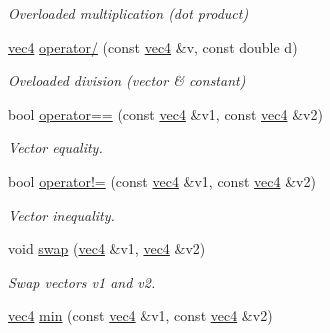\begin{DoxyCompactItemize}
\begin{DoxyCompactList}\small\item\em \-Overloaded multiplication (dot product) \end{DoxyCompactList}\item 
\hypertarget{classutil_1_1math_1_1vec4_a2b87dfafb4fb877b18db5a9f79dbe906}{\hyperlink{classutil_1_1math_1_1vec4}{vec4} \hyperlink{classutil_1_1math_1_1vec4_a2b87dfafb4fb877b18db5a9f79dbe906}{operator/} (const \hyperlink{classutil_1_1math_1_1vec4}{vec4} \&v, const double d)}\label{classutil_1_1math_1_1vec4_a2b87dfafb4fb877b18db5a9f79dbe906}

\begin{DoxyCompactList}\small\item\em \-Oveloaded division (vector \& constant) \end{DoxyCompactList}\item 
\hypertarget{classutil_1_1math_1_1vec4_adb09bd6661ff658c2575e34f5e92ed35}{bool \hyperlink{classutil_1_1math_1_1vec4_adb09bd6661ff658c2575e34f5e92ed35}{operator==} (const \hyperlink{classutil_1_1math_1_1vec4}{vec4} \&v1, const \hyperlink{classutil_1_1math_1_1vec4}{vec4} \&v2)}\label{classutil_1_1math_1_1vec4_adb09bd6661ff658c2575e34f5e92ed35}

\begin{DoxyCompactList}\small\item\em \-Vector equality. \end{DoxyCompactList}\item 
\hypertarget{classutil_1_1math_1_1vec4_a6a0e8f6719192b8a57231393cd0cab95}{bool \hyperlink{classutil_1_1math_1_1vec4_a6a0e8f6719192b8a57231393cd0cab95}{operator!=} (const \hyperlink{classutil_1_1math_1_1vec4}{vec4} \&v1, const \hyperlink{classutil_1_1math_1_1vec4}{vec4} \&v2)}\label{classutil_1_1math_1_1vec4_a6a0e8f6719192b8a57231393cd0cab95}

\begin{DoxyCompactList}\small\item\em \-Vector inequality. \end{DoxyCompactList}\item 
\hypertarget{classutil_1_1math_1_1vec4_af29eeaaf78d5e0877ab3e51dc7b647b3}{void \hyperlink{classutil_1_1math_1_1vec4_af29eeaaf78d5e0877ab3e51dc7b647b3}{swap} (\hyperlink{classutil_1_1math_1_1vec4}{vec4} \&v1, \hyperlink{classutil_1_1math_1_1vec4}{vec4} \&v2)}\label{classutil_1_1math_1_1vec4_af29eeaaf78d5e0877ab3e51dc7b647b3}

\begin{DoxyCompactList}\small\item\em \-Swap vectors v1 and v2. \end{DoxyCompactList}\item 
\hypertarget{classutil_1_1math_1_1vec4_a19d8e8885a3146dc0ada5b82406bdceb}{\hyperlink{classutil_1_1math_1_1vec4}{vec4} \hyperlink{classutil_1_1math_1_1vec4_a19d8e8885a3146dc0ada5b82406bdceb}{min} (const \hyperlink{classutil_1_1math_1_1vec4}{vec4} \&v1, const \hyperlink{classutil_1_1math_1_1vec4}{vec4} \&v2)}\label{classutil_1_1math_1_1vec4_a19d8e8885a3146dc0ada5b82406bdceb}


\end{DoxyCompactItemize}

